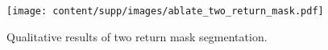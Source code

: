 \begin{figure}[t]
\centering
\texttt{[image: content/supp/images/ablate\_two\_return\_mask.pdf]}

\caption{Qualitative results of two return mask segmentation.}
\label{fig:supp_ablate_two_return_mask}

\end{figure}